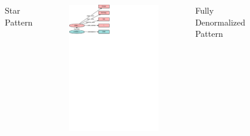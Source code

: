 \begin{frame}{\patsec}
\begin{columns}
        Star Pattern
        \begin{figure}
            \includegraphics[trim=0 648 325 0,clip,width=.5\textheight]{images/starpattern.pdf}
        \end{figure}
        Fully Denormalized Pattern
        \begin{figure}

\end{figure}
\end{columns}
\end{frame}
